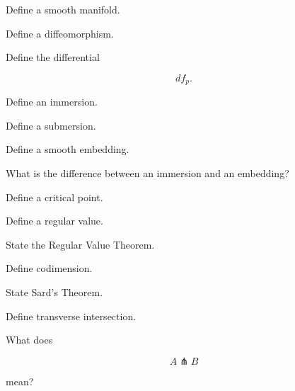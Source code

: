 \begin{exercise}[1]
Define a smooth manifold.
\end{exercise}

\begin{exercise}[1]
Define a diffeomorphism.
\end{exercise}

\begin{exercise}[1]
Define the differential

\[
df_p.
\]
\end{exercise}

\begin{exercise}[1]
Define an immersion.
\end{exercise}

\begin{exercise}[1]
Define a submersion.
\end{exercise}

\begin{exercise}[1]
Define a smooth embedding.
\end{exercise}

\begin{exercise}[1]
What is the difference between an immersion and an embedding?
\end{exercise}

\begin{exercise}[1]
Define a critical point.
\end{exercise}

\begin{exercise}[1]
Define a regular value.
\end{exercise}

\begin{exercise}[1]
State the Regular Value Theorem.
\end{exercise}

\begin{exercise}[1]
Define codimension.
\end{exercise}

\begin{exercise}[1]
State Sard's Theorem.
\end{exercise}

\begin{exercise}[1]
Define transverse intersection.
\end{exercise}

\begin{exercise}[1]
What does

\[
A\pitchfork B
\]

mean?
\end{exercise}

